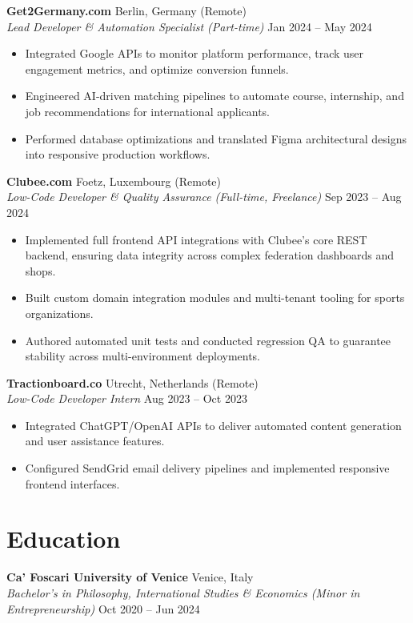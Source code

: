 \documentclass[10pt,a4paper]{article}
\begin{document}
\vspace{3pt}
\noindent\textbf{Get2Germany.com} \hfill Berlin, Germany (Remote)\\
\textit{Lead Developer \& Automation Specialist (Part-time)} \hfill Jan 2024 -- May 2024
\begin{itemize}
    \item Integrated Google APIs to monitor platform performance, track user engagement metrics, and optimize conversion funnels.
    \item Engineered AI-driven matching pipelines to automate course, internship, and job recommendations for international applicants.
    \item Performed database optimizations and translated Figma architectural designs into responsive production workflows.
\end{itemize}

\vspace{3pt}
\noindent\textbf{Clubee.com} \hfill Foetz, Luxembourg (Remote)\\
\textit{Low-Code Developer \& Quality Assurance (Full-time, Freelance)} \hfill Sep 2023 -- Aug 2024
\begin{itemize}
    \item Implemented full frontend API integrations with Clubee's core REST backend, ensuring data integrity across complex federation dashboards and shops.
    \item Built custom domain integration modules and multi-tenant tooling for sports organizations.
    \item Authored automated unit tests and conducted regression QA to guarantee stability across multi-environment deployments.
\end{itemize}

\vspace{3pt}
\noindent\textbf{Tractionboard.co} \hfill Utrecht, Netherlands (Remote)\\
\textit{Low-Code Developer Intern} \hfill Aug 2023 -- Oct 2023
\begin{itemize}
    \item Integrated ChatGPT/OpenAI APIs to deliver automated content generation and user assistance features.
    \item Configured SendGrid email delivery pipelines and implemented responsive frontend interfaces.
\end{itemize}

\section*{Education}
\noindent\textbf{Ca' Foscari University of Venice} \hfill Venice, Italy\\
\textit{Bachelor's in Philosophy, International Studies \& Economics (Minor in Entrepreneurship)} \hfill Oct 2020 -- Jun 2024
\end{document}
